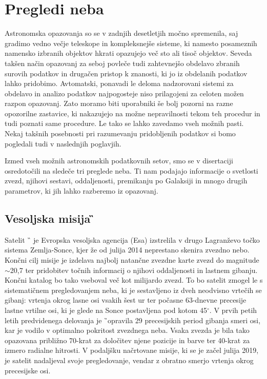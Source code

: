 \section{Pregledi neba}
\label{sec:slo_pregledi}
Astronomska opazovanja so se v zadnjih desetletjih močno spremenila, saj gradimo vedno večje teleskope in kompleksnejše sisteme, ki namesto posameznih namensko izbranih objektov hkrati opazujejo več sto ali tisoč objektov. Seveda takšen način opazovanj za seboj povleče tudi zahtevnejšo obdelavo zbranih surovih podatkov in drugačen pristop k znanosti, ki jo iz obdelanih podatkov lahko pridobimo. Avtomatski, ponavadi le deloma nadzorovani sistemi za obdelavo in analizo podatkov najpogosteje niso prilagojeni za celoten možen razpon opazovanj. Zato moramo biti uporabniki še bolj pozorni na razne opozorilne zastavice, ki nakazujejo na možne nepravilnosti tekom teh procedur in tudi poznati same procedure. Le tako se lahko zavedamo vseh možnih pasti. Nekaj takšnih posebnosti pri razumevanju pridobljenih podatkov si bomo pogledali tudi v naslednjih poglavjih.

Izmed vseh možnih astronomskih podatkovnih setov, smo se v disertaciji osredotočili na sledeče tri preglede neba. Ti nam podajajo informacije o svetlosti zvezd, njihovi sestavi, oddaljenosti, premikanju po Galaksiji in mnogo drugih parametrov, ki jih lahko razberemo iz opazovanj.

\subsection{Vesoljska misija \G}
\label{sec:slo_gaia}
Satelit \G\ \cite{2016A&A...595A...1G} je Evropska vesoljska agencija (Esa) izstrelila v drugo Lagranževo točko sistema Zemlja-Sonce, kjer že od julija 2014 neprestano skenira zvezdno nebo. Končni cilj misije je izdelava najbolj natančne zvezdne karte zvezd do magnitude $\sim$20,7 ter pridobitev točnih informacij o njihovi oddaljenosti in lastnem gibanju. Končni katalog bo tako vseboval več kot milijardo zvezd. To bo satelit zmogel le s sistematičnem pregledovanjem neba, ki je sestavljeno iz dveh neodvisno vrtečih se gibanj: vrtenja okrog lasne osi vsakih šest ur ter počasne 63-dnevne precesije lastne vrtilne osi, ki je glede na Sonce postavljena pod kotom 45$^\circ$. V prvih petih letih predvidenega delovanja je \G\ opravila 29 precesijskih period gibanja smeri osi, kar je vodilo v optimalno pokritost zvezdnega neba. Vsaka zvezda je bila tako opazovana približno 70-krat za določitev njene pozicije in barve ter 40-krat za izmero radialne hitrosti. V podaljšku načrtovane misije, ki se je začel julija 2019, je satelit nadaljeval svoje pregledovanje, vendar z obratno smerjo vrtenja okrog precesijske osi.

